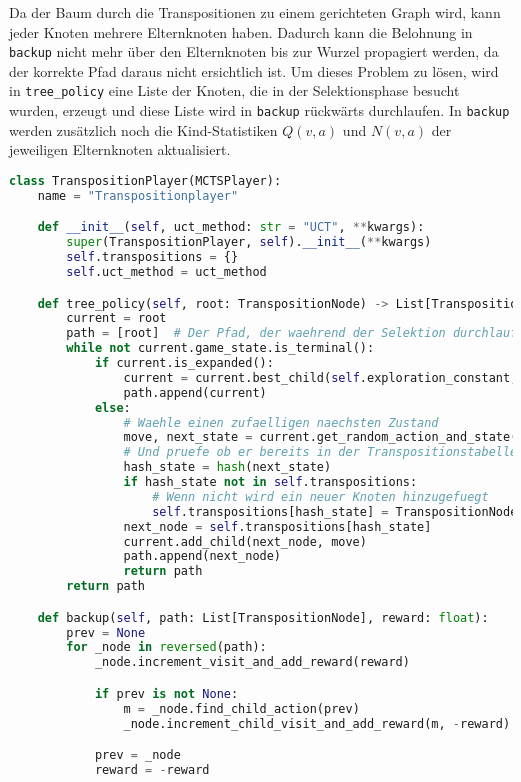 Da der Baum durch die Transpositionen zu einem gerichteten Graph wird, kann jeder Knoten mehrere Elternknoten haben.
Dadurch kann die Belohnung in \verb|backup| nicht mehr über den Elternknoten bis zur Wurzel propagiert werden, da der korrekte Pfad daraus nicht ersichtlich ist.
Um dieses Problem zu lösen, wird in \verb|tree_policy| eine Liste der Knoten, die in der Selektionsphase besucht wurden, erzeugt und diese Liste wird in \verb|backup| rückwärts durchlaufen.
In \verb|backup| werden zusätzlich noch die Kind-Statistiken $Q(v,a)$ und $N(v,a)$ der jeweiligen Elternknoten aktualisiert.

\begin{lstlisting}[language=Python,label={lst:transposition-player}]
class TranspositionPlayer(MCTSPlayer):
    name = "Transpositionplayer"

    def __init__(self, uct_method: str = "UCT", **kwargs):
        super(TranspositionPlayer, self).__init__(**kwargs)
        self.transpositions = {}
        self.uct_method = uct_method

    def tree_policy(self, root: TranspositionNode) -> List[TranspositionNode]:
        current = root
        path = [root]  # Der Pfad, der waehrend der Selektion durchlaufen wird
        while not current.game_state.is_terminal():
            if current.is_expanded():
                current = current.best_child(self.exploration_constant, uct_method=self.uct_method)
                path.append(current)
            else:
                # Waehle einen zufaelligen naechsten Zustand
                move, next_state = current.get_random_action_and_state()
                # Und pruefe ob er bereits in der Transpositionstabelle enthalten ist
                hash_state = hash(next_state)
                if hash_state not in self.transpositions:
                    # Wenn nicht wird ein neuer Knoten hinzugefuegt
                    self.transpositions[hash_state] = TranspositionNode(game_state=next_state, parent=current)
                next_node = self.transpositions[hash_state]
                current.add_child(next_node, move)
                path.append(next_node)
                return path
        return path

    def backup(self, path: List[TranspositionNode], reward: float):
        prev = None
        for _node in reversed(path):
            _node.increment_visit_and_add_reward(reward)

            if prev is not None:
                m = _node.find_child_action(prev)
                _node.increment_child_visit_and_add_reward(m, -reward)

            prev = _node
            reward = -reward
\end{lstlisting}


